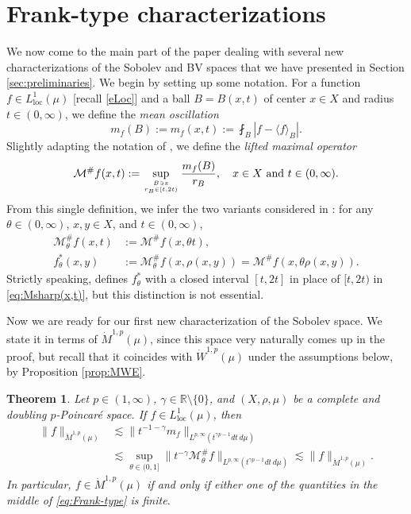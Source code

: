 \documentclass[11pt]{amsart}
\newtheorem{theorem}{Theorem}[section]
\theoremstyle{definition}
\theoremstyle{remark}
\numberwithin{equation}{section}
\newcommand{\ave}[1]{\langle #1\rangle}
\newcommand{\abs}[1]{|#1|}
\newcommand{\Norm}[2]{\|#1\|_{#2}}
\def\gfz{\genfrac{}{}{0pt}{}}
\begin{document}
\section{Frank-type characterizations}\label{s:Frank}

We now come to the main part of the paper dealing with several new characterizations of the
Sobolev and BV spaces that we have presented in Section \ref{sec:preliminaries}.
We begin by setting up some notation. For a function $f\in L^1_{\mathrm{loc}}(\mu)$ [recall
\eqref{eLoc}] and a ball $B=B(x,t)$ of center $x\in X$ and radius $t\in(0,\infty)$, we
define the \emph{mean oscillation}
\begin{equation*}
  m_f(B):=m_f(x,t):=\fint_{B}\abs{f-\ave{f}_B}.
\end{equation*}
Slightly adapting the notation of \cite{DLYYZ}, we define the \emph{lifted maximal operator}
\begin{equation}\label{eq:Msharp(x,t)}
  \mathcal M^{\#}f(x,t)
  :=\sup_{\gfz{B\owns x}{r_B\in[t,2t)}}\frac{m_f(B)}{r_B}, \quad x\in X\ \text{and}\
  t\in(0,\infty).
\end{equation}
From this single definition, we infer the two variants considered in \cite{DLYYZ}: for
any $\theta\in(0,\infty)$, $x,y\in X$, and $t\in(0,\infty)$,
\begin{equation*}
\begin{split}
  \mathcal M^{\#}_\theta f(x,t)
  &:=\mathcal M^{\#}f(x,\theta t),\\
  f_\theta^*(x,y)
  &:=\mathcal M^{\#}_\theta f(x,\rho(x,y))
  =\mathcal M^{\#}f(x,\theta\rho(x,y)).
\end{split}
\end{equation*}
Strictly speaking, \cite{DLYYZ} defines $f_\theta^*$ with a closed interval $[t,2t]$ in
place of $[t,2t)$ in \eqref{eq:Msharp(x,t)}, but this distinction is not essential.

Now we are ready for our first new characterization of the Sobolev space. We state it in
terms of $\dot M^{1,p}(\mu)$, since this space very naturally comes up in the proof, but
recall that it coincides with $\dot W^{1,p}(\mu)$ under the assumptions below, by
Proposition \ref{prop:MWE}.

\begin{theorem}\label{thm:Frank-type}
Let $p\in(1,\infty)$, $\gamma\in\mathbb R\setminus\{0\}$, and $(X,\rho,\mu)$ be a complete
and doubling $p$-Poincar\'e space. If $f\in L^1_{\mathrm{loc}}(\mu)$, then
\begin{subequations}\label{eq:Frank-type}
\begin{align}
  \Norm{f}{\dot M^{1,p}(\mu)}
  &\lesssim\Norm{t^{-1-\gamma}m_f}{L^{p,\infty}(t^{\gamma p-1}dt\,d\mu)}
    \label{eq:Frank-lower} \\
  &\lesssim\sup_{\theta\in(0,1]}
    \Norm{t^{-\gamma}\mathcal M_\theta^{\#}f}{L^{p,\infty}(t^{\gamma p-1}dt\,d\mu)}
   \lesssim\Norm{f}{\dot M^{1,p}(\mu)}.
   \label{eq:Frank-upper}
\end{align}
\end{subequations}
In particular, $f\in\dot M^{1,p}(\mu)$ if and only if either one of the quantities in the
middle of \eqref{eq:Frank-type} is finite.
\end{theorem}
\end{document}
